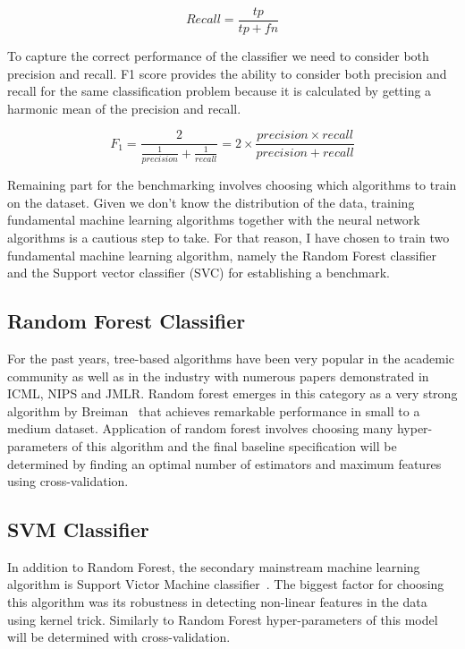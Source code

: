 \begin{equation}
    Recall = \frac{tp}{tp + fn}
\end{equation}

To capture the correct performance of the classifier we need to consider both precision and recall.
F1 score provides the ability to consider both precision and recall for the same classification problem because it is calculated by getting a harmonic mean of the precision and recall.

\begin{equation}
    F_1 = \frac{2}{\frac{1}{precision} + \frac{1}{recall}} = 2 \times \frac{precision \times recall}{precision + recall}
\end{equation}


Remaining part for the benchmarking involves choosing which algorithms to train on the dataset.
Given we don't know the distribution of the data, training fundamental machine learning algorithms together with the neural network algorithms is a cautious step to take. 
For that reason, I have chosen to train two fundamental machine learning algorithm, namely the Random Forest classifier and the Support vector classifier (SVC) for establishing a benchmark.


\subsection{Random Forest Classifier}
For the past years, tree-based algorithms have been very popular in the academic community as well as in the industry with numerous papers demonstrated in ICML, NIPS and JMLR.
Random forest emerges in this category as a very strong algorithm by Breiman~\cite{randomforest} that achieves remarkable performance in small to a medium dataset.
Application of random forest involves choosing many hyper-parameters of this algorithm and 
the final baseline specification will be determined by finding an optimal number of estimators and maximum features using cross-validation.


\subsection{SVM Classifier}
In addition to Random Forest, the secondary mainstream machine learning algorithm is Support Victor Machine classifier~\cite{svm}.
The biggest factor for choosing this algorithm was its robustness in detecting non-linear features in the data using kernel trick.
Similarly to Random Forest hyper-parameters of this model will be determined with cross-validation.

